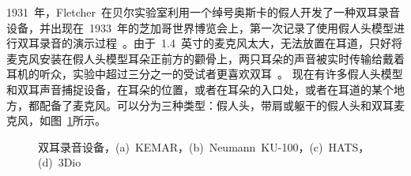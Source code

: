 1931~年，Fletcher~在贝尔实验室利用一个绰号奥斯卡的假人开发了一种双耳录音设备，并出现在~1933~年的芝加哥世界博览会上，第一次记录了使用假人头模型进行双耳录音的演示过程~。由于~1.4~英寸的麦克风太大，无法放置在耳道，只好将麦克风安装在假人头模型耳朵正前方的颧骨上，两只耳朵的声音被实时传输给戴着耳机的听众，实验中超过三分之一的受试者更喜欢双耳~。%
现在有许多假人头模型和双耳声音捕捉设备，在耳朵的位置，或者在耳朵的入口处，或者在耳道的某个地方，都配备了麦克风。可以分为三种类型：假人头，带肩或躯干的假人头和双耳麦克风，如图~\ref{fig:binaural_recording}所示。

\begin{figure}[H]
\centering
{}
\hfill
{}
\hfill
{}
\hfill
{}
\caption{双耳录音设备，(a)~KEMAR，(b)~Neumann~KU-100，(c)~HATS，(d)~3Dio}
\label{fig:binaural_recording}
\end{figure}


